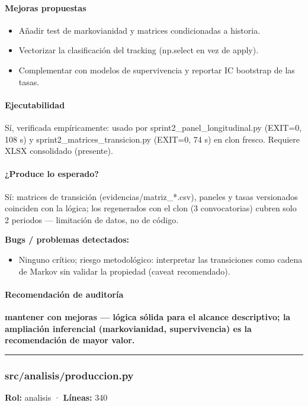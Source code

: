 \paragraph{Mejoras propuestas}
\begin{itemize}
  \item Añadir test de markovianidad y matrices condicionadas a historia.
  \item Vectorizar la clasificación del tracking (np.select en vez de apply).
  \item Complementar con modelos de supervivencia y reportar IC bootstrap de las tasas.
\end{itemize}

\paragraph{Ejecutabilidad}
Sí, verificada empíricamente: usado por sprint2\_panel\_longitudinal.py (EXIT=0, 108 s) y sprint2\_matrices\_transicion.py (EXIT=0, 74 s) en clon fresco. Requiere XLSX consolidado (presente).

\paragraph{¿Produce lo esperado?}
Sí: matrices de transición (evidencias/matriz\_*.csv), paneles y tasas versionados coinciden con la lógica; los regenerados con el clon (3 convocatorias) cubren solo 2 periodos --- limitación de datos, no de código.

\begin{tcolorbox}[riesgo]
\textbf{Bugs / problemas detectados:}
\begin{itemize}
  \item Ninguno crítico; riesgo metodológico: interpretar las transiciones como cadena de Markov sin validar la propiedad (caveat recomendado).
\end{itemize}
\end{tcolorbox}

\paragraph{Recomendación de auditoría}
\textbf{mantener con mejoras --- lógica sólida para el alcance descriptivo; la ampliación inferencial (markovianidad, supervivencia) es la recomendación de mayor valor.}

\medskip
\hrule

\subsubsection{src/analisis/produccion.py}
\textbf{Rol:} analisis · \textbf{Líneas:} 340

